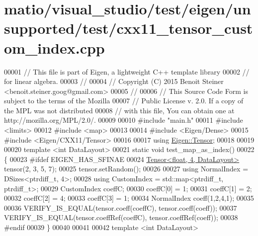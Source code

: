 \hypertarget{matio_2visual__studio_2test_2eigen_2unsupported_2test_2cxx11__tensor__custom__index_8cpp_source}{}\section{matio/visual\+\_\+studio/test/eigen/unsupported/test/cxx11\+\_\+tensor\+\_\+custom\+\_\+index.cpp}
\label{matio_2visual__studio_2test_2eigen_2unsupported_2test_2cxx11__tensor__custom__index_8cpp_source}

\begin{DoxyCode}
00001 \textcolor{comment}{// This file is part of Eigen, a lightweight C++ template library}
00002 \textcolor{comment}{// for linear algebra.}
00003 \textcolor{comment}{//}
00004 \textcolor{comment}{// Copyright (C) 2015 Benoit Steiner <benoit.steiner.goog@gmail.com>}
00005 \textcolor{comment}{//}
00006 \textcolor{comment}{// This Source Code Form is subject to the terms of the Mozilla}
00007 \textcolor{comment}{// Public License v. 2.0. If a copy of the MPL was not distributed}
00008 \textcolor{comment}{// with this file, You can obtain one at http://mozilla.org/MPL/2.0/.}
00009 
00010 \textcolor{preprocessor}{#include "main.h"}
00011 \textcolor{preprocessor}{#include <limits>}
00012 \textcolor{preprocessor}{#include <map>}
00013 
00014 \textcolor{preprocessor}{#include <Eigen/Dense>}
00015 \textcolor{preprocessor}{#include <Eigen/CXX11/Tensor>}
00016 
00017 \textcolor{keyword}{using} \hyperlink{class_eigen_1_1_tensor}{Eigen::Tensor};
00018 
00019 
00020 \textcolor{keyword}{template} <\textcolor{keywordtype}{int} DataLayout>
00021 \textcolor{keyword}{static} \textcolor{keywordtype}{void} test\_map\_as\_index()
00022 \{
00023 \textcolor{preprocessor}{#ifdef EIGEN\_HAS\_SFINAE}
00024   \hyperlink{class_eigen_1_1_tensor}{Tensor<float, 4, DataLayout>} tensor(2, 3, 5, 7);
00025   tensor.setRandom();
00026 
00027   \textcolor{keyword}{using} NormalIndex = DSizes<ptrdiff\_t, 4>;
00028   \textcolor{keyword}{using} CustomIndex = std::map<ptrdiff\_t, ptrdiff\_t>;
00029   CustomIndex coeffC;
00030   coeffC[0] = 1;
00031   coeffC[1] = 2;
00032   coeffC[2] = 4;
00033   coeffC[3] = 1;
00034   NormalIndex coeff(1,2,4,1);
00035 
00036   VERIFY\_IS\_EQUAL(tensor.coeff(coeffC), tensor.coeff(coeff));
00037   VERIFY\_IS\_EQUAL(tensor.coeffRef(coeffC), tensor.coeffRef(coeff));
00038 \textcolor{preprocessor}{#endif}
00039 \}
00040 
00041 
00042 \textcolor{keyword}{template} <\textcolor{keywordtype}{int} DataLayout>

\end{DoxyCode}
